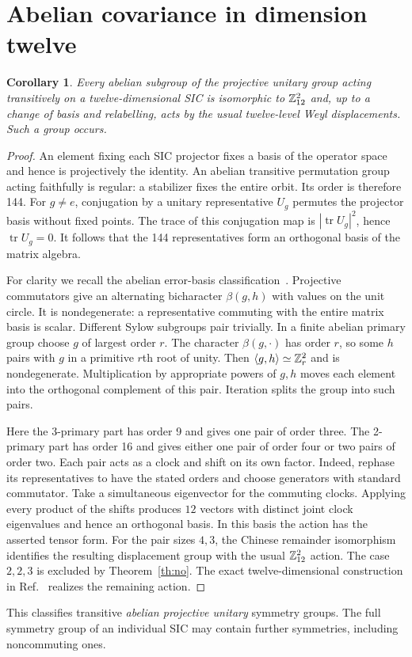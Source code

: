 \documentclass[11pt]{article}
\newtheorem{corollary}[theorem]{Corollary}
\newcommand{\tr}{\operatorname{tr}}\newcommand{\rank}{\operatorname{rank}}
\begin{document}
\section{Abelian covariance in dimension twelve}

\begin{corollary}\label{cor:abel}
Every abelian subgroup of the projective unitary group acting transitively on a twelve-dimensional SIC is isomorphic to $\mathbb Z_{12}^2$ and, up to a change of basis and relabelling, acts by the usual twelve-level Weyl displacements. Such a group occurs.
\end{corollary}
\begin{proof}
An element fixing each SIC projector fixes a basis of the operator space and hence is projectively the identity. An abelian transitive permutation group acting faithfully is regular: a stabilizer fixes the entire orbit. Its order is therefore 144. For $g\ne e$, conjugation by a unitary representative $U_g$ permutes the projector basis without fixed points. The trace of this conjugation map is $|\tr U_g|^2$, hence $\tr U_g=0$. It follows that the 144 representatives form an orthogonal basis of the matrix algebra.

For clarity we recall the abelian error-basis classification~\cite{kr}. Projective commutators give an alternating bicharacter $\beta(g,h)$ with values on the unit circle. It is nondegenerate: a representative commuting with the entire matrix basis is scalar. Different Sylow subgroups pair trivially. In a finite abelian primary group choose $g$ of largest order $r$. The character $\beta(g,\cdot)$ has order $r$, so some $h$ pairs with $g$ in a primitive $r$th root of unity. Then $\langle g,h\rangle\simeq\mathbb Z_r^2$ and is nondegenerate. Multiplication by appropriate powers of $g,h$ moves each element into the orthogonal complement of this pair. Iteration splits the group into such pairs.

Here the 3-primary part has order 9 and gives one pair of order three. The 2-primary part has order 16 and gives either one pair of order four or two pairs of order two. Each pair acts as a clock and shift on its own factor. Indeed, rephase its representatives to have the stated orders and choose generators with standard commutator. Take a simultaneous eigenvector for the commuting clocks. Applying every product of the shifts produces $12$ vectors with distinct joint clock eigenvalues and hence an orthogonal basis. In this basis the action has the asserted tensor form. For the pair sizes $4,3$, the Chinese remainder isomorphism identifies the resulting displacement group with the usual $\mathbb Z_{12}^2$ action. The case $2,2,3$ is excluded by Theorem~\ref{th:no}. The exact twelve-dimensional construction in Ref.~\cite{appleby} realizes the remaining action.
\end{proof}
This classifies transitive \emph{abelian projective unitary} symmetry groups. The full symmetry group of an individual SIC may contain further symmetries, including noncommuting ones.
\end{document}

